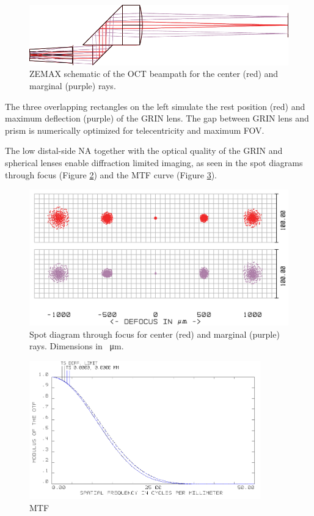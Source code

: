 	\begin{figure}[h!]\centering
      \includegraphics{figures/30_DesignSimulation/Optical/beamsplitter.pdf}
      \caption{ZEMAX schematic of the OCT beampath for the center (red) and marginal (purple) rays.}
      \label{fig:BS}
\end{figure}

The three overlapping rectangles on the left simulate the rest position (red) and maximum deflection (purple) of the GRIN lens. The gap between GRIN lens and prism is numerically optimized for telecentricity and maximum FOV.

	The low distal-side NA together with the optical quality of the GRIN and spherical lenses enable diffraction limited imaging, as seen in the spot diagrams through focus (Figure \ref{fig:BSspot}) and the MTF curve (Figure \ref{fig:BSMTF}).
	
\begin{figure}[h!]\centering
      \includegraphics{figures/30_DesignSimulation/Optical/beamsplitterSpot.png}
      \caption{Spot diagram through focus for center (red) and marginal (purple) rays. Dimensions in \SI{}{\micro\meter}.}
      \label{fig:BSspot}
\end{figure}

\begin{figure}[h!]\centering
      \includegraphics[width=10cm]{figures/30_DesignSimulation/Optical/beamsplitterMTF.png}
      \caption{MTF}
      \label{fig:BSMTF}
\end{figure}

